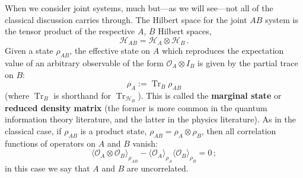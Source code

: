 \documentclass[11pt]{article}
\newcommand{\ev}[1]{\langle{#1}\rangle}
\newcommand{\HH}{\mathcal{H}}
\newcommand{\OO}{\mathcal{O}}
\DeclareMathOperator{\Tr}{Tr}
\begin{document}
When we consider joint systems, much but---as we will see---not all of the classical discussion carries through. The Hilbert space for the joint $AB$ system is the tensor product of the respective $A$, $B$ Hilbert spaces,
\begin{equation}\label{AB factorization}
\HH_{AB}=\HH_A\otimes\HH_B\,.
\end{equation}
Given a state $\rho_{AB}$, the effective state on $A$ which reproduces the expectation value of an arbitrary observable of the form $\OO_A\otimes I_B$ is given by the partial trace on $B$:
\begin{equation}
\rho_A:=\Tr_B\rho_{AB}
\end{equation}
(where $\Tr_B$ is shorthand for $\Tr_{\HH_B}$). This is called the \textbf{marginal state} or \textbf{reduced density matrix} (the former is more common in the quantum information theory literature, and the latter in the physics literature). As in the classical case, if $\rho_{AB}$ is a product state, $\rho_{AB}=\rho_A\otimes\rho_B$, then all correlation functions of operators on $A$ and $B$ vanish:
\begin{equation}
\ev{\OO_A\otimes\OO_B}_{\rho_{AB}} - \ev{\OO_A}_{\rho_A}\ev{\OO_B}_{\rho_B} = 0\,;
\end{equation}
in this case we say that $A$ and $B$ are uncorrelated.
\end{document}
